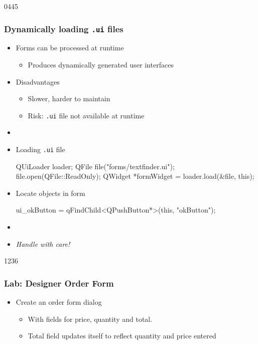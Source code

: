 \begin{slide}[fragile]{0445}\frametitle{Dynamically loading \texttt{.ui} files}
\begin{itemize}
\item Forms can be processed at runtime
  \begin{itemize}
  \item Produces dynamically generated user interfaces
  \end{itemize}
\item Disadvantages
  \begin{itemize}
  \item Slower, harder to maintain
  \item Risk: \texttt{.ui} file not available at runtime
  \end{itemize}
\item[] 
\item Loading \texttt{.ui} file
 \begin{cpp}
QUiLoader loader;
QFile file("forms/textfinder.ui");
file.open(QFile::ReadOnly);
QWidget *formWidget = loader.load(&file, this);
\end{cpp}
\item Locate objects in form
\begin{cpp}
ui_okButton = qFindChild<QPushButton*>(this, "okButton");
\end{cpp}
\item[] 
\item \emph{Handle with care!}

\end{itemize}
\end{slide}


\begin{slide}[fragile]{1236}
\frametitle{Lab: Designer Order Form}
\begin{itemize}
\item Create an order form dialog
  \begin{itemize}
  \item With fields for price, quantity and total.
  \item Total field updates itself to reflect quantity and price entered
  \end{itemize}
\end{itemize} 




\end{slide}

